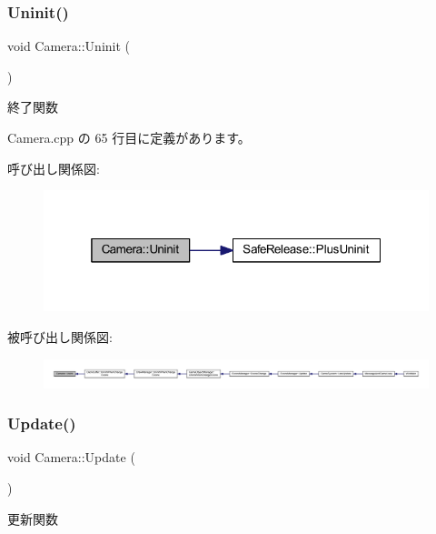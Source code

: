 \subsubsection{\texorpdfstring{Uninit()}{Uninit()}}
{\footnotesize\ttfamily void Camera\+::\+Uninit (\begin{DoxyParamCaption}{ }\end{DoxyParamCaption})}



終了関数 



 Camera.\+cpp の 65 行目に定義があります。

呼び出し関係図\+:
\nopagebreak
\begin{figure}[H]
\begin{center}
\leavevmode
\includegraphics[width=319pt]{class_camera_a8b3337b3e560ea6a780d646bc8c509d7_cgraph}
\end{center}
\end{figure}
被呼び出し関係図\+:
\nopagebreak
\begin{figure}[H]
\begin{center}
\leavevmode
\includegraphics[width=350pt]{class_camera_a8b3337b3e560ea6a780d646bc8c509d7_icgraph}
\end{center}
\end{figure}
\mbox{\label{class_camera_a4a596a3ea1fdc7d244ba4268031a360b}} 
\subsubsection{\texorpdfstring{Update()}{Update()}}
{\footnotesize\ttfamily void Camera\+::\+Update (\begin{DoxyParamCaption}{ }\end{DoxyParamCaption})}



更新関数 



